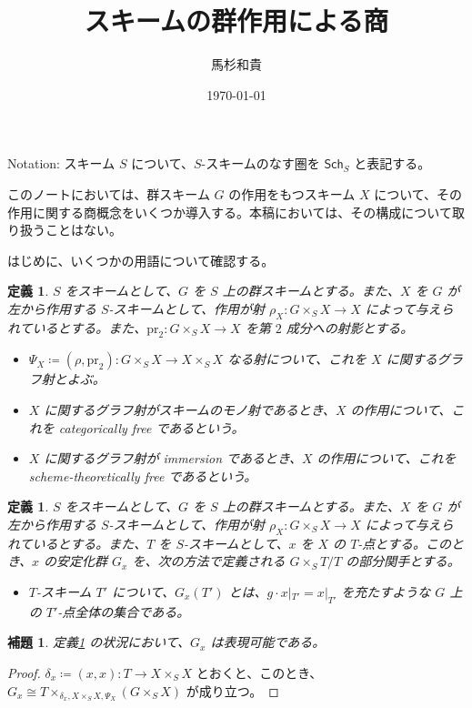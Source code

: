 \documentclass{jsarticle}
\title{スキームの群作用による商}
\author{馬杉和貴}
\date{\today}
\newcommand{\deq}{\coloneqq}
\newtheorem{lem}[thm]{補題}
\newtheorem{defn}[thm]{定義}
\begin{document}
\maketitle

Notation: スキーム $S$ について、$S$-スキームのなす圏を $\mathsf{Sch}_S$ と表記する。

このノートにおいては、群スキーム $G$ の作用をもつスキーム $X$ について、その作用に関する商概念をいくつか導入する。本稿においては、その構成について取り扱うことはない。

はじめに、いくつかの用語について確認する。

\begin{defn}
	$S$ をスキームとして、$G$ を $S$ 上の群スキームとする。また、$X$ を $G$ が左から作用する $S$-スキームとして、作用が射 $\rho_X \colon G \times_S X \to X$ によって与えられているとする。また、$\mathrm{pr}_2 \colon G \times_S X \to X$ を第 $2$ 成分への射影とする。
	\begin{itemize}
		\item $\Psi_X \deq (\rho, \mathrm{pr}_2) \colon G \times_S X \to X \times_S X$ なる射について、これを $X$ に関するグラフ射とよぶ。
		\item $X$ に関するグラフ射がスキームのモノ射であるとき、$X$ の作用について、これを categorically free であるという。
		\item $X$ に関するグラフ射が immersion であるとき、$X$ の作用について、これを scheme-theoretically free であるという。
	\end{itemize}
\end{defn}

\begin{defn}\label{def_stablizer}
	$S$ をスキームとして、$G$ を $S$ 上の群スキームとする。また、$X$ を $G$ が左から作用する $S$-スキームとして、作用が射 $\rho_X \colon G \times_S X \to X$ によって与えられているとする。また、$T$ を $S$-スキームとして、$x$ を $X$ の $T$-点とする。このとき、$x$ の安定化群 $G_x$ を、次の方法で定義される $G \times_S T / T$ の部分関手とする。
	\begin{itemize}
		\item $T$-スキーム $T'$ について、$G_x(T')$ とは、$g \cdot x|_{T'} = x|_{T'}$ を充たすような $G$ 上の $T'$-点全体の集合である。
	\end{itemize}
\end{defn}

\begin{lem}
	定義\ref{def_stablizer} の状況において、$G_x$ は表現可能である。
\end{lem}
\begin{proof}
	$\delta_x \deq (x, x) \colon T \to X \times_S X$ とおくと、このとき、$G_x \cong T \times_{\delta_x, X \times_S X, \Psi_X} (G \times_S X)$ が成り立つ。
\end{proof}
\end{document}
